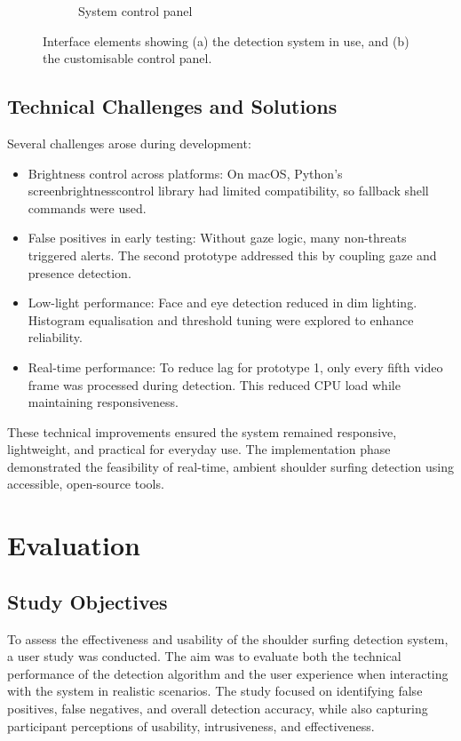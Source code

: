 \documentclass[12pt]{article}
\theoremstyle{plain}
\theoremstyle{definition}
\begin{document}
\begin{figure}[h!]
\begin{subfigure}[c]{0.45\textwidth}
    \caption{System control panel}
    \label{fig:gui_controls}
  \end{subfigure}
  \caption{Interface elements showing (a) the detection system in use, and (b) the customisable control panel.}
  \label{fig:gui_overview}
\end{figure}

\subsection{Technical Challenges and Solutions}

Several challenges arose during development:
\begin{itemize}
  \item Brightness control across platforms: On macOS, Python’s screen\textunderscore brightness\textunderscore control library had limited compatibility, so fallback shell commands were used.
  \item False positives in early testing: Without gaze logic, many non-threats triggered alerts. The second prototype addressed this by coupling gaze and presence detection.
  \item Low-light performance: Face and eye detection reduced in dim lighting. Histogram equalisation and threshold tuning were explored to enhance reliability.
  \item Real-time performance: To reduce lag for prototype 1, only every fifth video frame was processed during detection. This reduced CPU load while maintaining responsiveness.
\end{itemize}

These technical improvements ensured the system remained responsive, lightweight, and practical for everyday use. The implementation phase demonstrated the feasibility of real-time, ambient shoulder surfing detection using accessible, open-source tools.

\section{Evaluation}

\subsection{Study Objectives}

To assess the effectiveness and usability of the shoulder surfing detection system, a user study was conducted. The aim was to evaluate both the technical performance of the detection algorithm and the user experience when interacting with the system in realistic scenarios. The study focused on identifying false positives, false negatives, and overall detection accuracy, while also capturing participant perceptions of usability, intrusiveness, and effectiveness.
\end{document}
